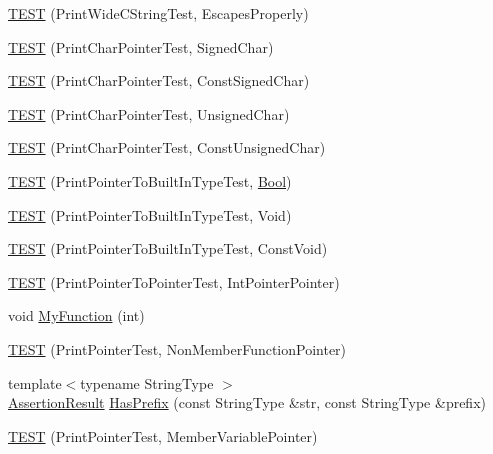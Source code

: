 \begin{DoxyCompactItemize}
\item 
\hyperlink{namespacetesting_1_1gtest__printers__test_aa80d6bb47e6bf997dacf0c75322d12cf}{T\+E\+ST} (Print\+Wide\+C\+String\+Test, Escapes\+Properly)
\item 
\hyperlink{namespacetesting_1_1gtest__printers__test_acd7a56709621a91dca669023d192bdc7}{T\+E\+ST} (Print\+Char\+Pointer\+Test, Signed\+Char)
\item 
\hyperlink{namespacetesting_1_1gtest__printers__test_ae854b0ca4d06ffc273c391f262884681}{T\+E\+ST} (Print\+Char\+Pointer\+Test, Const\+Signed\+Char)
\item 
\hyperlink{namespacetesting_1_1gtest__printers__test_afb9a6a26323b287b7666b6adb5bdb149}{T\+E\+ST} (Print\+Char\+Pointer\+Test, Unsigned\+Char)
\item 
\hyperlink{namespacetesting_1_1gtest__printers__test_aa0487f8fd5052f7d6afe2b18ad7931f9}{T\+E\+ST} (Print\+Char\+Pointer\+Test, Const\+Unsigned\+Char)
\item 
\hyperlink{namespacetesting_1_1gtest__printers__test_ad08dcd672b1e66a802a564eb974c400a}{T\+E\+ST} (Print\+Pointer\+To\+Built\+In\+Type\+Test, \hyperlink{structBool}{Bool})
\item 
\hyperlink{namespacetesting_1_1gtest__printers__test_ac6d8b84db9386b399eb431b5b1668e87}{T\+E\+ST} (Print\+Pointer\+To\+Built\+In\+Type\+Test, Void)
\item 
\hyperlink{namespacetesting_1_1gtest__printers__test_a8819fb42392faae72e8bc594d498085d}{T\+E\+ST} (Print\+Pointer\+To\+Built\+In\+Type\+Test, Const\+Void)
\item 
\hyperlink{namespacetesting_1_1gtest__printers__test_afee54807b15b623718c62008bd743d4b}{T\+E\+ST} (Print\+Pointer\+To\+Pointer\+Test, Int\+Pointer\+Pointer)
\item 
void \hyperlink{namespacetesting_1_1gtest__printers__test_adf0e590d6776ecb7095a989ff2272d7b}{My\+Function} (int)
\item 
\hyperlink{namespacetesting_1_1gtest__printers__test_aa3cb60cf6f3a4a0cd7d9873cd597ffd8}{T\+E\+ST} (Print\+Pointer\+Test, Non\+Member\+Function\+Pointer)
\item 
{\footnotesize template$<$typename String\+Type $>$ }\\\hyperlink{classtesting_1_1AssertionResult}{Assertion\+Result} \hyperlink{namespacetesting_1_1gtest__printers__test_abbd436200da6c80944c8a7504fb56ea1}{Has\+Prefix} (const String\+Type \&str, const String\+Type \&prefix)
\item 
\hyperlink{namespacetesting_1_1gtest__printers__test_a434cafcc1dbee409992bbb1593034480}{T\+E\+ST} (Print\+Pointer\+Test, Member\+Variable\+Pointer)

\end{DoxyCompactItemize}
